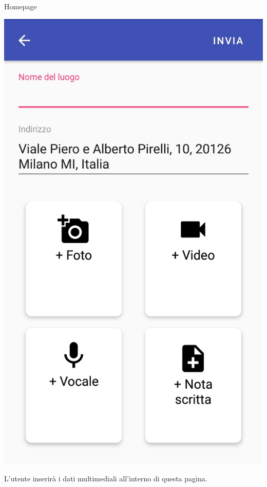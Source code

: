\documentclass[11pt,aspectratio=169]{beamer}
\begin{document}
\begin{frame}{Homepage}
\noindent
    \begin{minipage}{0.3\textwidth}
    \includegraphics[scale=0.1]{Tesi/images/Homepage.jpg}
    \end{minipage}
\hfill
\begin{minipage}{0.6\textwidth}
L'utente inserirà i dati multimediali all'interno di questa pagina.
\end{minipage}
\end{frame}
\end{document}
